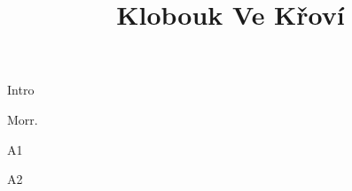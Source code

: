 \documentclass[timestamp]{jazzgrid}
\title{Klobouk Ve Křoví}
\begin{document}
\maketitle
\begin{musicsection}{Intro}
\barline
	{\barfour{}
		{}
		{}
		{}
		{}
	}
	{\barfour{}
		{}
		{}
		{}
		{}
	}
	{\barfour{}
		{}
		{}
		{}
		{}
	}
	{\barfour{}
		{}
		{}
		{}
		{}
	}
\barline
	{\barfour{}
		{}
		{}
		{}
		{}
	}
	{\barfour{}
		{}
		{}
		{}
		{}
	}
	{\barfour{}
		{}
		{}
		{}
		{}
	}
	{\barfour{}
		{}
		{}
		{}
		{}
	}
\end{musicsection}

\begin{musicsection}{Morr.}
\barline
	{\barfour{}
		{}
		{}
		{}
		{}
	}
	{\barfour{}
		{}
		{}
		{}
		{}
	}
	{\barfour{}
		{}
		{}
		{}
		{}
	}
	{\barfour{}
		{}
		{}
		{}
		{}
	}
\barline
	{\barfour{}
		{}
		{}
		{}
		{}
	}
	{\barfour{}
		{}
		{}
		{}
		{}
	}
	{\barfour{}
		{}
		{}
		{}
		{}
	}
	{\barfour{}
		{}
		{}
		{}
		{}
	}
	{\barfour{}
		{}
		{}
		{}
		{}
	}
	{\barfour{}
		{}
		{}
		{}
		{}
	}
	{\barfour{}
		{}
		{}
		{}
		{}
	}
\end{musicsection}

\begin{musicsection}{A1}
\barline
	{\barfour{}
		{}
		{}
		{}
		{}
	}
	{\barfour{}
		{}
		{}
		{}
		{}
	}
	{\barfour{}
		{}
		{}
		{}
		{}
	}
	{\barfour{}
		{}
		{}
		{}
		{}
	}
\barline
	{\barfour{}
		{}
		{}
		{}
		{}
	}
	{\barfour{}
		{}
		{}
		{}
		{}
	}
	{\barfour{}
		{}
		{}
		{}
		{}
	}
	{\barfour{}
		{}
		{}
		{}
		{}
	}
\end{musicsection}

\begin{musicsection}{A2}
\barline
	{\barfour{}
		{}
		{}
		{}
		{}
	}
	{\barfour{}
		{}
		{}
		{}
		{}
	}
	{\barfour{}
		{}
		{}
		{}
		{}
	}
	{\barfour{}
		{}
		{}
		{}
		{}
	}
\barline
	{\barfour{}
		{}
		{}
		{}
		{}
	}
	{\barfour{}
		{}
		{}
		{}
		{}
	}
	{\barfour{}
		{}
		{}
		{}
		{}
	}
	{\barfour{}
		{}
		{}
		{}
		{}
	}
\end{musicsection}
\end{document}
